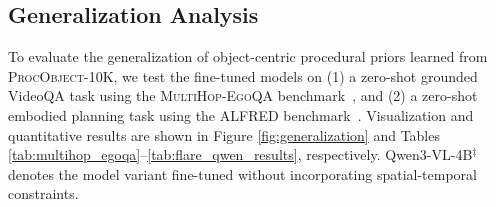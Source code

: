 
\subsection{Generalization Analysis}
\label{sec:generalization}

To evaluate the generalization of object-centric procedural priors learned from \textsc{ProcObject-10K}, we test the fine-tuned models on (1) a zero-shot grounded VideoQA task using the \textsc{MultiHop-EgoQA} benchmark~\cite{chen2025grounded}, and (2) a zero-shot embodied planning task using the ALFRED benchmark~\cite{ALFRED20}. Visualization and quantitative results are shown in Figure \ref{fig:generalization} and Tables \ref{tab:multihop_egoqa}--\ref{tab:flare_qwen_results}, respectively. Qwen3-VL-4B$^\ddagger$ denotes the model variant fine-tuned without incorporating spatial-temporal constraints.

